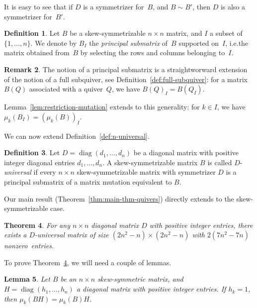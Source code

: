 \documentclass[10pt]{amsart}
\newtheorem{theorem}{Theorem}[section]
\newtheorem{lemma}[theorem]{Lemma}
\theoremstyle{definition}
\newtheorem{definition}[theorem]{Definition}
\newtheorem{remark}[theorem]{Remark}
\newcommand{\ie}{i.e.}
\DeclareMathOperator{\diag}{diag}
\begin{document}
It is easy to see that if $D$ is a symmetrizer for~$B$, and $B\sim B'$, then $D$ is also a symmetrizer for~$B'$. 

\begin{definition}
Let $B$ be a skew-symmetrizable $n\times n$ matrix, and $I$ a subset of $\{1,\dots,n\}$. We denote by $B_I$ the \emph{principal submatrix} of~$B$ supported on~$I$, \ie the matrix obtained from~$B$ by selecting the rows and columns belonging to~$I$. 
\end{definition}

\begin{remark}
The notion of a principal submatrix is a straightworward extension of the notion of a full subquiver, see Definition~\ref{def:full-subquiver}: for a matrix $B(Q)$ associated with a quiver~$Q$, we have $B(Q)_I=B(Q_I)$. 

Lemma~\ref{lem:restriction-mutation} extends to this generality: for $k\in I$, we have $\mu_k(B_I)=(\mu_k(B))_I$. 
\end{remark}


We can now extend Definition~\ref{def:n-universal}. 

\begin{definition}
Let $D=\diag (d_1,\dots,d_n)$ be a diagonal matrix with positive integer diagonal entries $d_1,...,d_n$. 
A skew-symmetrizable matrix $B$ is called $D$-\emph{universal} if every $n\times n$ skew-symmetrizable matrix with symmetrizer $D$ is a principal submatrix of a matrix mutation equivalent to $B$. 
\end{definition}

Our main result (Theorem~\ref{thm:main-thm-quivers}) directly extends to the skew-symmetrizable case. 

\begin{theorem}
\label{main_thm1}
For any $n\times n$ diagonal matrix $D$ with positive integer entries, there exists a $D$-universal matrix of size $(2n^2\!-\!n)\!\times\!(2n^2\!-\!n)$ with $2(7n^2\!-\!7n)$ nonzero~entries. 
\end{theorem}

To prove Theorem~\ref{main_thm1}, we will need a couple of lemmas. 

\begin{lemma}
\label{lem:mu-BD}
Let $B$ be an $n\times n$ skew-symmetric matrix, and $H=\diag (h_1,\dots,h_n)$ a diagonal matrix with positive integer entries. If $h_k=1$, then $\mu_k(BH)=\mu_k(B)H$. 
\end{lemma}
\end{document}
